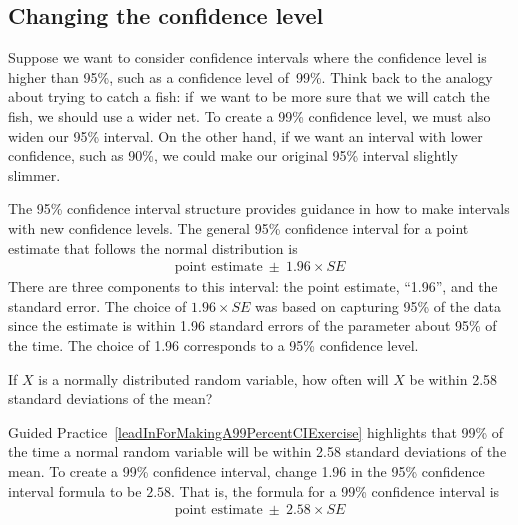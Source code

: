 \subsection{Changing the confidence level}
\label{changingTheConfidenceLevelSection}


Suppose we want to consider confidence intervals where the confidence
level is higher than 95\%, such as a confidence
level of~99\%. Think back to the analogy about trying to catch a fish:
if~we want to be more sure that we will catch the fish, we should use
a wider net. To create a 99\% confidence level, we must also widen our
95\% interval. On the other hand, if we want an interval with lower
confidence, such as 90\%, we could make our original 95\% interval
slightly slimmer.

The 95\% confidence interval structure provides guidance in how to
make intervals with new confidence levels. The general 95\% confidence
interval for a point estimate that follows the normal distribution is
\begin{eqnarray*}
\text{point estimate}\ \pm\ 1.96\times SE
\end{eqnarray*}
There are three components to this interval: the point estimate,
``1.96'', and the standard error. The choice of $1.96\times SE$ was
based on capturing 95\% of the data since the estimate is within
1.96 standard errors of the parameter about 95\% of the time.
The choice of 1.96 corresponds to a 95\% confidence level. 

\begin{exercisewrap}
\begin{nexercise} \label{leadInForMakingA99PercentCIExercise}
If $X$ is a normally distributed random variable, how often will $X$
be within 2.58 standard deviations of the mean?\footnotemark
\end{nexercise}
\end{exercisewrap}

Guided Practice~\ref{leadInForMakingA99PercentCIExercise} highlights
that 99\% of the time a normal random variable will be within
2.58 standard deviations of the mean.
To create a 99\% confidence interval, change 1.96 in the 95\%
confidence interval formula to be $2.58$.
That is, the formula
for a 99\% confidence interval is
\begin{align*}
\text{point estimate}\ \pm\ 2.58\times SE
\end{align*}

